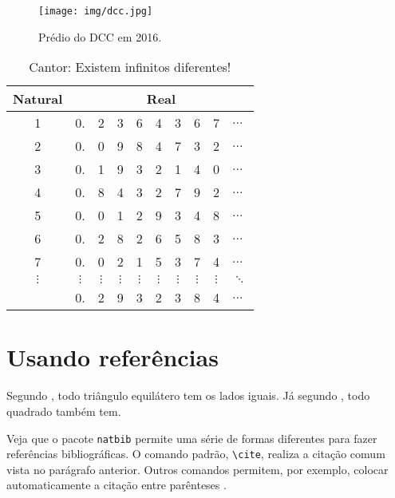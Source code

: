 \documentclass[
	msc, %
	english %
]{ppgccufmg}
\begin{document}
		\begin{figure}[h]
			\centering
			\texttt{[image: img/dcc.jpg]}
			\caption{Prédio do DCC em 2016.}
			\label{fig:exemplo}
		\end{figure}
	
		\lipsum[5]
		
		\begin{table}[h]
			\centering
			\begin{tabular}{c|ccccccccl}
				Natural & \multicolumn{9}{c}{Real}   \\ \hline
				1 & 0.  & {\color{red} 2}  & 3   & 6   & 4   & 3   & 6   & 7   & $\ldots$ \\
				2  & 0.  & 0   & {\color{red} 9}  & 8   & 4   & 7   & 3   & 2   & $\ldots$ \\
				3  & 0.  & 1   & 9   & {\color{red} 3}  & 2   & 1   & 4   & 0   & $\ldots$ \\
				4  & 0.  & 8   & 4   & 3   & {\color{red} 2}  & 7   & 9   & 2   & $\ldots$ \\
				5  & 0.  & 0   & 1   & 2   & 9   & {\color{red} 3}  & 4   & 8   & $\ldots$ \\
				6  & 0.  & 2   & 8   & 2   & 6   & 5   & {\color{red} 8}  & 3   & $\ldots$ \\
				7  & 0.  & 0   & 2   & 1   & 5   & 3   & 7   & {\color{red} 4}  & $\ldots$ \\
				$\vdots$ & $\vdots$  & $\vdots$  & $\vdots$  & $\vdots$  & $\vdots$  & $\vdots$  & $\vdots$  & $\vdots$  & $\ddots$ \\ \hline
				\multicolumn{1}{l|}{} & \multicolumn{1}{l}{0.} & \multicolumn{1}{l}{{\color{red} 2}} & \multicolumn{1}{l}{{\color{red} 9}} & \multicolumn{1}{l}{{\color{red} 3}} & \multicolumn{1}{l}{{\color{red} 2}} & \multicolumn{1}{l}{{\color{red} 3}} & \multicolumn{1}{l}{{\color{red} 8}} & \multicolumn{1}{l}{{\color{red} 4}} & $\ldots$
			\end{tabular}
			\caption{Cantor: Existem infinitos diferentes!}
			\label{tab:exemplo}
		\end{table}

		\section{Usando referências}
			Segundo \cite{horn86robot}, todo triângulo equilátero tem os lados iguais. Já segundo \cite{shashua97photometric}, todo quadrado também tem.
			
			Veja que o pacote \verb|natbib| permite uma série de formas diferentes para fazer referências bibliográficas. O comando padrão, \verb|\cite|, realiza a citação comum vista no parágrafo anterior. Outros comandos permitem, por exemplo, colocar automaticamente a citação entre	parênteses \citep{hougen93estimation, sato99illumination2, sato99illumination1, sato01stability}.
			
\end{document}
